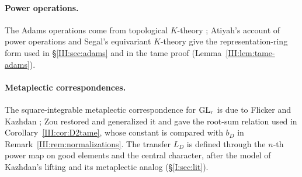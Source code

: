 \paragraph{Power operations.} The Adams operations come from topological $K$-theory \cite{Ada62}; Atiyah's account of power operations \cite{Ati66} and Segal's equivariant $K$-theory \cite{Seg68} give the representation-ring form used in \S\ref{III:sec:adams} and in the tame proof (Lemma~\ref{III:lem:tame-adams}).

\paragraph{Metaplectic correspondences.} The square-integrable metaplectic correspondence for $\operatorname{GL}_r$ is due to Flicker and Kazhdan \cite{FK86}; Zou \cite{Zo23} restored and generalized it and gave the root-sum relation used in Corollary~\ref{III:cor:D2tame}, whose constant is compared with $b_D$ in Remark~\ref{III:rem:normalizations}. The transfer $L_D$ is defined through the $n$-th power map on good elements and the central character, after the model of Kazhdan's lifting and its metaplectic analog (\S\ref{I:sec:lit}).

